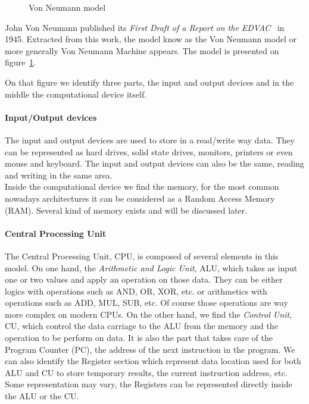 \begin{figure}
\centering 

\caption{Von Neumann model}
\label{fig:1_HPC:von_neumann_model}
\end{figure}

John Von Neumann published its \textit{First Draft of a Report on the EDVAC}~\cite{von1993first} in 1945. 
Extracted from this work, the model know as the Von Neumann model or more generally Von Neumann Machine appears. 
The model is presented on figure~\ref{fig:1_HPC:von_neumann_model}.

On that figure we identify three parts, the input and output devices and in the middle the computational device itself. 
\paragraph{Input/Output devices}
The input and output devices are used to store in a read/write way data. 
They can be represented as hard drives, solid state drives, monitors, printers or even mouse and keyboard.
The input and output devices can also be the same, reading and writing in the same area.\\

Inside the computational device we find the memory, for the most common nowadays architectures it can be considered as a Random Access Memory (RAM). 
Several kind of memory exists and will be discussed later. 

\paragraph{Central Processing Unit}
The Central Processing Unit, CPU, is composed of several elements in this model. 
On one hand, the \textit{Arithmetic and Logic Unit}, ALU, which takes as input one or two values and apply an operation on those data. 
They can be either logics with operations such as AND, OR, XOR, etc. or arithmetics with operations such as ADD, MUL, SUB, etc. 
Of course those operations are way more complex on modern CPUs. 
On the other hand, we find the \textit{Control Unit}, CU, which control the data carriage to the ALU from the memory and the operation to be perform on data.
It is also the part that takes care of the Program Counter (PC), the address of the next instruction in the program. 
We can also identify the Register section which represent data location used for both ALU and CU to store temporary results, the current instruction address, etc. 
Some representation may vary, the Registers can be represented directly inside the ALU or the CU. 
